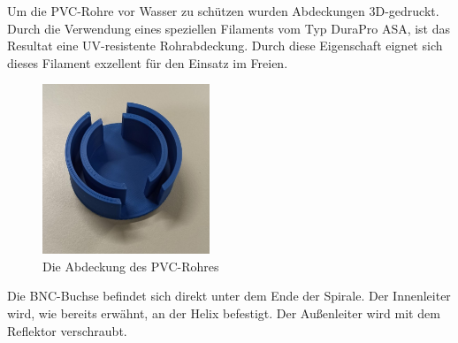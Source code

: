 Um die PVC-Rohre vor Wasser zu schützen wurden Abdeckungen 3D-gedruckt. Durch die Verwendung eines speziellen Filaments vom Typ DuraPro ASA, ist das Resultat eine UV-resistente Rohrabdeckung. Durch diese Eigenschaft eignet sich dieses Filament exzellent für den Einsatz im Freien.

\begin{figure}[H]
	\centering
	\includegraphics[width=5cm]{../ref/Abdeckung-PVC-Rohr.jpg}
	\caption{Die Abdeckung des PVC-Rohres}
	\label{fig:PVC-Rohr-Abdeckung}
\end{figure}

Die BNC-Buchse befindet sich direkt unter dem Ende der Spirale. Der Innenleiter wird, wie bereits erwähnt, an der Helix befestigt. Der Außenleiter wird mit dem Reflektor verschraubt.


